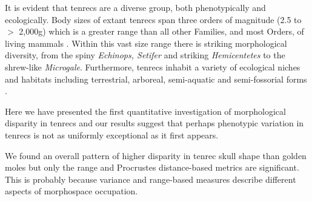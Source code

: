\documentclass[12pt,a4paper]{article}
\begin{document}
	It is evident that tenrecs are a diverse group, both phenotypically and ecologically. Body sizes of extant tenrecs span three orders of magnitude (2.5 to $>$ 2,000g) which is a greater range than all other Families, and most Orders, of living mammals \citep{Olson2003}. Within this vast size range there is striking morphological diversity, from the spiny \textit{Echinops, Setifer} and striking \textit{Hemicentetes} to the shrew-like  \textit{Microgale}. Furthermore, tenrecs inhabit a variety of ecological niches and habitats including terrestrial, arboreal, semi-aquatic and semi-fossorial forms \citep{Soarimalala2011}. 
	
	Here we have presented the first quantitative investigation of morphological disparity in tenrecs and our results suggest that perhaps phenotypic variation in tenrecs is not as uniformly exceptional as it first appears.





	We found an overall pattern of higher disparity in tenrec skull shape than golden moles but only the range and Procrustes distance-based metrics are significant. This is probably because variance and range-based measures describe different aspects of morphospace occupation. 




	
	
	
\end{document}
